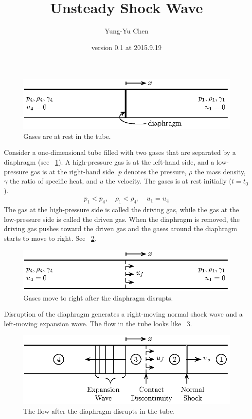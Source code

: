 \documentclass[a4paper,12pt,dvips]{article}
\numberwithin{equation}{section}
\begin{document}
\title{Unsteady Shock Wave}
\author{Yung-Yu Chen}
\date{version 0.1 at 2015.9.19}

\maketitle


\begin{figure}[h]
\centering
\includegraphics{tube_at_rest.eps}
\caption{Gases are at rest in the tube.}
\label{f:tube_at_rest}
\end{figure}

Consider a one-dimensional tube filled with two gases that are separated by a
diaphragm (see \figurename~\ref{f:tube_at_rest}).  A high-pressure gas is at
the left-hand side, and a low-pressure gas is at the right-hand side.  $p$
denotes the pressure, $\rho$ the mass density, $\gamma$ the ratio of specific
heat, and $u$ the velocity.  The gases is at rest initially ($t = t_0$).
\begin{align}
  p_1 < p_4 , \quad
  \rho_1 < \rho_4, \quad
  u_1 = u_4
\end{align}
The gas at the high-pressure side is called the driving gas, while the gas at
the low-pressure side is called the driven gas.  When the diaphragm is removed,
the driving gas pushes toward the driven gas and the gases around the diaphragm
starts to move to right.  See \figurename~\ref{f:tube_move_right}.

\begin{figure}[h]
\centering
\includegraphics{tube_move_right.eps}
\caption{Gases move to right after the diaphragm disrupts.}
\label{f:tube_move_right}
\end{figure}

Disruption of the diaphragm generates a right-moving normal shock wave and a
left-moving expansion wave.  The flow in the tube looks like
\figurename~\ref{f:tube_zones}.

\begin{figure}[h]
\centering
\includegraphics{tube_zones.eps}
\caption{The flow after the diaphragm disrupts in the tube.}
\label{f:tube_zones}
\end{figure}
\end{document}
